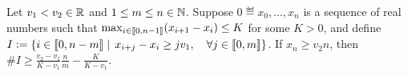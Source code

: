 \begin{lemma}\label{lem:ExpTailsGoodSequencesTechnical}
Let $v_1 < v_2 \in \mathbb{R}$ and $1 \leq m \leq n \in \mathbb{N}$. Suppose $0 \eqdef x_0, ..., x_n$ is a sequence of real numbers such that $\max_{i \in \llbracket0, n - 1\rrbracket} (x_{i+1} - x_i) \leq K$ for some $K > 0$, and define $I \vcentcolon= \{ i \in \llbracket0, n - m\rrbracket \mid\, x_{i + j} - x_i \geq j v_1,\quad \forall j\in\llbracket0,m\rrbracket\}$. If $x_n \geq v_2 n$, then $\#I \geq \frac{v_2 - v_1}{K - v_1}\frac{n}{m} - \frac{K}{K - v_1}$. 
\end{lemma}

\newpage